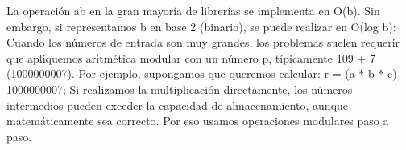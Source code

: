 \markdownRendererDocumentBegin
\markdownRendererSectionBegin
{}\markdownRendererInterblockSeparator
{}La operación \markdownRendererDollarSign{}a\markdownRendererCircumflex{}b\markdownRendererDollarSign{} en la gran mayoría de librerías se implementa en \markdownRendererDollarSign{}O(b)\markdownRendererDollarSign{}.\markdownRendererHardLineBreak
{}Sin embargo, si representamos \markdownRendererDollarSign{}b\markdownRendererDollarSign{} en base 2 (binario), se puede realizar en \markdownRendererDollarSign{}O(log b)\markdownRendererDollarSign{}:\markdownRendererInterblockSeparator
{}\markdownRendererInterblockSeparator
{}
\markdownRendererSectionEnd \markdownRendererSectionBegin
{}\markdownRendererInterblockSeparator
{}Cuando los números de entrada son muy grandes, los problemas suelen requerir que apliquemos aritmética modular con un número p, típicamente \markdownRendererDollarSign{}10\markdownRendererCircumflex{}9\markdownRendererDollarSign{} + 7 (1000000007).\markdownRendererParagraphSeparator
{}Por ejemplo, supongamos que queremos calcular: \markdownRendererDollarSign{}r = (a * b * c) \markdownRendererPercentSign{} 1000000007;\markdownRendererDollarSign{}\markdownRendererParagraphSeparator
{}Si realizamos la multiplicación directamente, los números intermedios pueden exceder la capacidad de almacenamiento, aunque matemáticamente sea correcto. Por eso usamos operaciones modulares paso a paso.\markdownRendererInterblockSeparator
{}\markdownRendererSectionBegin
\markdownRendererSectionBegin
{}\markdownRendererParagraphSeparator
{}
\markdownRendererSectionEnd 
\markdownRendererSectionEnd 
\markdownRendererSectionEnd \markdownRendererDocumentEnd